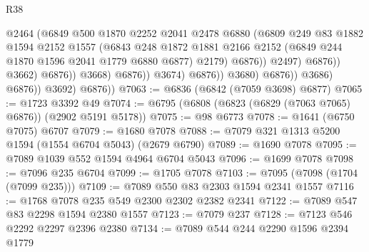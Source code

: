 \begin{lexlean}{R38}
\begin{coremodule}
                                              @2464
                                              (@6849
                                                @500
                                                @1870
                                                @2252
                                                @2041
                                                @2478
                                                @6880
                                                (@6809
                                                  @249
                                                  @83
                                                  @1882
                                                  @1594
                                                  @2152
                                                  @1557
                                                  (@6843
                                                    @248
                                                    @1872
                                                    @1881
                                                    @2166
                                                    @2152
                                                    (@6849 @244 @1870 @1596 @2041 @1779 @6880 @6877)
                                                    @2179)
                                                  @6876))
                                              @2497)
                                            @6876))
                                        @3662)
                                      @6876))
                                  @3668)
                                @6876))
                            @3674)
                          @6876))
                      @3680)
                    @6876))
                @3686)
              @6876))
          @3692)
        @6876))
@7063 := @6836 (@6842 (@7059 @3698) @6877)
@7065 := @1723 @3392 @49
@7074 := @6795 (@6808 (@6823 (@6829 (@7063 @7065) @6876)) (@2902 @5191 @5178))
@7075 := @98 @6773
@7078 := @1641 (@6750 @7075) @6707
@7079 := @1680 @7078
@7088 := @7079 @321 @1313 @5200 @1594 (@1554 @6704 @5043) (@2679 @6790)
@7089 := @1690 @7078
@7095 := @7089 @1039 @552 @1594 @4964 @6704 @5043
@7096 := @1699 @7078
@7098 := @7096 @235 @6704
@7099 := @1705 @7078
@7103 := @7095 (@7098 (@1704 (@7099 @235)))
@7109 := @7089 @550 @83 @2303 @1594 @2341 @1557
@7116 := @1768 @7078 @235 @549 @2300 @2302 @2382 @2341
@7122 := @7089 @547 @83 @2298 @1594 @2380 @1557
@7123 := @7079 @237
@7128 := @7123 @546 @2292 @2297 @2396 @2380
@7134 := @7089 @544 @244 @2290 @1596 @2394 @1779

\end{coremodule}
\end{lexlean}
